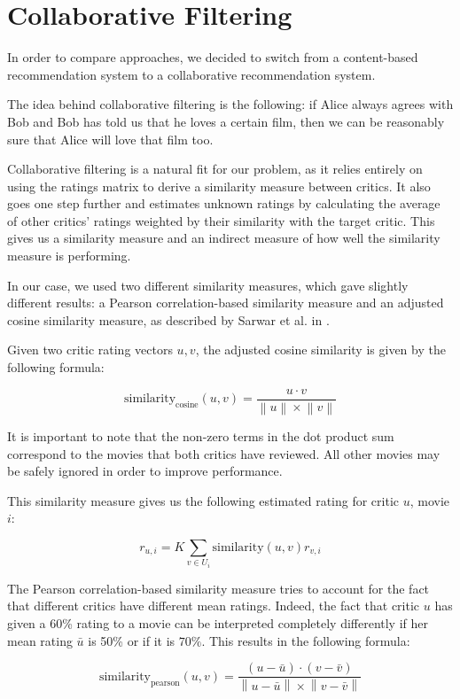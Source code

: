 \documentclass[12pt]{article}
\newcommand{\norm}[1]{\left\lVert#1\right\rVert}
\begin{document}
\section{Collaborative Filtering}

In order to compare 
approaches, we decided to switch from a content-based recommendation system to
a collaborative recommendation system.

The idea behind collaborative filtering is the following: if Alice always
agrees with Bob and Bob has told us that he loves a certain film, then we can
be reasonably sure that Alice will love that film too.

Collaborative filtering is a natural fit for our problem, as it relies entirely
on using the ratings matrix to derive a similarity measure between critics. It
also goes one step further and estimates unknown ratings by calculating the
average of other critics' ratings weighted by their similarity with the target
critic. This gives us a similarity measure and an indirect measure of how well
the similarity measure is performing.

In our case, we used two different similarity measures, which gave slightly
different results: a Pearson correlation-based similarity measure and an
adjusted cosine similarity measure, as described by Sarwar et al. in
\cite{Sarwar01}.

Given two critic rating vectors $u,v$, the adjusted cosine similarity is given
by the following formula:

$$ \text{similarity}_{\text{cosine}}(u,v) =
\frac{u \cdot v}{\norm{u} \times \norm{v}} $$

It is important to note that the non-zero terms in the dot product sum
correspond to the movies that both critics have reviewed. All other movies may
be safely ignored in order to improve performance.

This similarity measure gives us the following estimated rating for critic $u$,
movie $i$:

$$ r_{u,i} = K \sum_{v \in U_i} \text{similarity}(u,v) r_{v,i} $$

The Pearson correlation-based similarity measure tries to account for the fact
that different critics have different mean ratings. Indeed, the fact that
critic $u$ has given a 60\% rating to a movie
can be interpreted completely differently if her mean rating
$\bar{u}$ is 50\% or if it is $70\%$. This results in the following formula:

$$ \text{similarity}_{\text{pearson}}(u,v) =
\frac{ (u - \bar{u}) \cdot (v - \bar{v})}
{\norm{u - \bar{u}} \times \norm{v-\bar{v}}} $$
\end{document}
